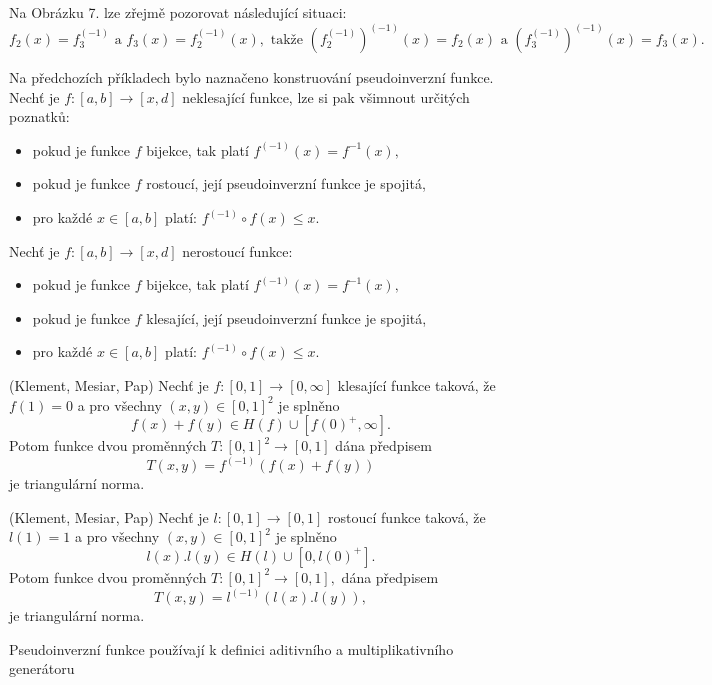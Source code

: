 Na Obrázku 7. lze zřejmě pozorovat následující situaci: $$f_2(x)=f_3^{(-1)}\text{ a } f_3(x)=f_2^{(-1)}(x), \text{ takže } (f_2^{(-1)})^{(-1)}(x)=f_2(x) \text{ a }
            (f_3^{(-1)})^{(-1)}(x)=f_3(x).$$
\begin{remark} Na předchozích příkladech bylo naznačeno konstruování pseudoinverzní funkce. Nech\v t je $f:[a,b] \rightarrow [x,d]$ neklesající funkce, lze si pak všimnout určitých poznatk\r u:
    \begin{itemize}
        \item pokud je funkce $f$ bijekce, tak platí $f^{(-1)}(x) = f^{-1}(x),$
        \item  pokud je funkce $f$ rostoucí, její pseudoinverzní funkce je spojitá,
        \item  pro každé $x \in [a,b]$ platí: $f^{(-1)}\circ f(x)\leq x.$
    \end{itemize}
    Nech\v t je $f:[a,b] \rightarrow [x,d]$ nerostoucí funkce:
    \begin{itemize}
        \item pokud je funkce $f$ bijekce, tak platí $f^{(-1)}(x) = f^{-1}(x),$
        \item  pokud je funkce $f$ klesající, její pseudoinverzní funkce je spojitá,
        \item  pro každé $x \in [a,b]$ platí: $f^{(-1)}\circ f(x)\leq x.$
    \end{itemize}
\end{remark}

\begin{sentence} (Klement, Mesiar, Pap)
    Nech\v t je $f:[0,1] \rightarrow [0,\infty]$ klesající funkce
    taková, že $f(1)=0$ a pro všechny $(x,y) \in [0,1]^2$  je splněno
    $$f(x)+f(y) \in H(f) \cup [f(0)^+,\infty].$$
    Potom funkce dvou proměnných $T:[0,1]^2 \rightarrow [0,1]$ dána předpisem
    $$T(x,y)=f^{(-1)}(f(x)+f(y))$$
    je triangulární norma.
\end{sentence}
\begin{sentence}(Klement, Mesiar, Pap)
    Nech\v t je $l:[0,1] \rightarrow [0,1]$ rostoucí funkce
    taková, že $l(1)=1$ a pro všechny $(x,y) \in [0,1]^2$  je splněno
    $$l(x).l(y) \in H(l) \cup [0,l(0)^+].$$
    Potom funkce dvou proměnných $T:[0,1]^2 \rightarrow [0,1],$ dána předpisem
    $$T(x,y)=l^{(-1)}(l(x).l(y)),$$
    je triangulární norma.
\end{sentence}

Pseudoinverzní funkce používají k definici aditivního a multiplikativního generátoru

